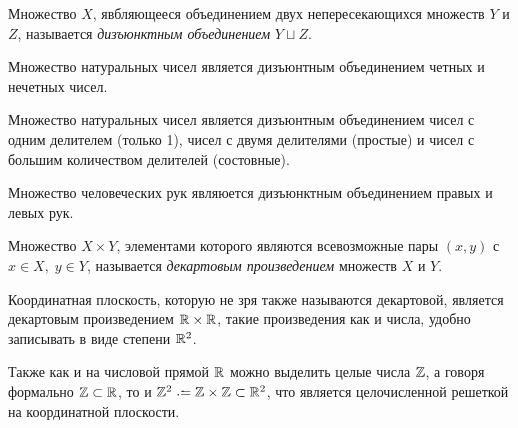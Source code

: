 \begin{definition}
    Множество $X$, явбляющееся объединением двух непересекающихся множеств $Y$ и $Z$, называется \emph{дизъюнктным объединением} $Y \sqcup Z$.
\end{definition}

\begin{example}
    Множество натуральных чисел является дизъюнтным объединением четных и нечетных чисел.

    Множество натуральных чисел является дизъюнтным объединением чисел с одним делителем (только 1), чисел с двумя делителями (простые) и чисел с большим количеством делителей (состовные).
\end{example}
\begin{example}
    Множество человеческих рук являюется дизъюнктным объединением правых и левых рук.
\end{example}

\begin{definition}
    Множество $X \times Y$, элементами которого являются всевозможные пары $(x, y)$ с $x \in X,\; y \in Y$, называется \emph{декартовым произведением} множеств $X$ и $Y$.
\end{definition}

\begin{example}
    Координатная плоскость, которую не зря также называются декартовой, является декартовым произведением $\mathbb R \times \mathbb R$, такие произведения как и числа, удобно записывать в виде степени $\mathbb R^2$.
    
    Также как и на числовой прямой $\mathbb R$ можно выделить целые числа $\mathbb Z$, а говоря формально $\mathbb Z \subset \mathbb R$, то и $\Z^2 \coloneq \Z \times \Z \subset \R^2$, что является целочисленной решеткой на координатной плоскости.
\end{example}

